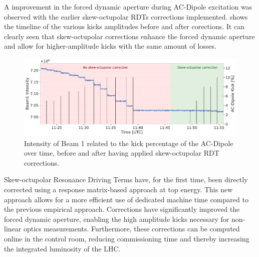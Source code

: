 A improvement in the forced dynamic aperture during AC-Dipole excitation was observed with the
earlier skew-octupolar RDTs corrections implemented. 
shows the timeline of the various kicks amplitudes before and after corections.
It can clearly seen that skew-octupolar corrections enhance the forced dynamic aperture and allow
for higher-amplitude kicks with the same amount of losses.

\begin{figure}[!htb]
    \centering
    \includegraphics[width=1\textwidth]{./images/timeline_losses_with_without_a4corr.pdf}
    \caption{Intensity of Beam 1 related to the kick percentage of the AC-Dipole over time, before
    and after having applied skew-octupolar RDT corrections.}
    \label{fig:decapoles:losses_a4_corrs_timeline}
\end{figure}



Skew-octupolar Resonance Driving Terms have, for the first time, been directly corrected using a
response matrix-based approach at top energy. This new approach allows for a more efficient
use of dedicated machine time compared to the previous empirical approach. Corrections have
significantly improved the forced dynamic aperture, enabling the high amplitude kicks necessary for
non-linear optics measurements.
Furthermore, these corrections can be computed online in the control room, reducing commissioning
time and thereby increasing the integrated luminosity of the LHC.




